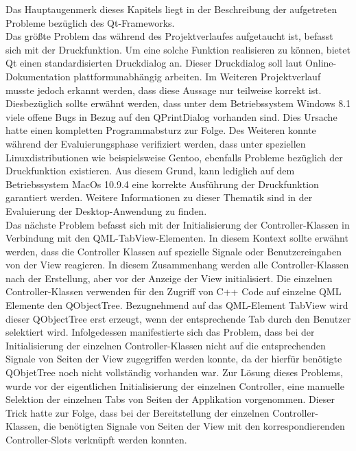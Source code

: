 Das Hauptaugenmerk dieses Kapitels liegt in der Beschreibung der aufgetreten Probleme bezüglich des Qt-Frameworks. \\
Das größte Problem das während des Projektverlaufes aufgetaucht ist, befasst sich mit der Druckfunktion. Um eine solche Funktion realisieren zu können, bietet Qt einen standardisierten Druckdialog an. Dieser Druckdialog soll laut Online-Dokumentation plattformunabhängig arbeiten. Im Weiteren Projektverlauf musste jedoch erkannt werden, dass diese Aussage nur teilweise korrekt ist. Diesbezüglich sollte erwähnt werden, dass unter dem Betriebssystem Windows 8.1 viele offene Bugs in Bezug auf den QPrintDialog vorhanden sind. Dies Ursache hatte einen kompletten Programmabsturz zur Folge. Des Weiteren konnte während der Evaluierungsphase verifiziert werden, dass unter speziellen Linuxdistributionen wie beispielsweise Gentoo, ebenfalls Probleme bezüglich der Druckfunktion existieren. Aus diesem Grund, kann lediglich auf dem Betriebssystem MacOs 10.9.4 eine korrekte Ausführung der Druckfunktion garantiert werden. Weitere Informationen zu dieser Thematik sind in der Evaluierung der Desktop-Anwendung zu finden. \\
Das nächste Problem befasst sich mit der Initialisierung der Controller-Klassen in Verbindung mit den QML-TabView-Elementen. In diesem Kontext sollte erwähnt werden, dass die Controller Klassen auf spezielle Signale oder Benutzereingaben von der View reagieren. In diesem Zusammenhang werden alle Controller-Klassen nach der Erstellung, aber vor der Anzeige der View initialisiert. Die einzelnen Controller-Klassen verwenden für den Zugriff von C++ Code auf einzelne QML Elemente den QObjectTree. Bezugnehmend auf das QML-Element TabView wird dieser QObjectTree erst erzeugt, wenn der entsprechende Tab durch den Benutzer selektiert wird. Infolgedessen manifestierte sich das Problem, dass bei der Initialisierung der einzelnen Controller-Klassen nicht auf die entsprechenden Signale von Seiten der View zugegriffen werden konnte, da der hierfür benötigte QObjetTree noch nicht vollständig vorhanden war. Zur Lösung dieses Problems, wurde vor der eigentlichen Initialisierung der einzelnen Controller, eine manuelle Selektion der einzelnen Tabs von Seiten der Applikation vorgenommen. Dieser Trick hatte zur Folge, dass bei der Bereitstellung der einzelnen Controller-Klassen, die benötigten Signale von Seiten der View mit den korrespondierenden Controller-Slots verknüpft werden konnten.
